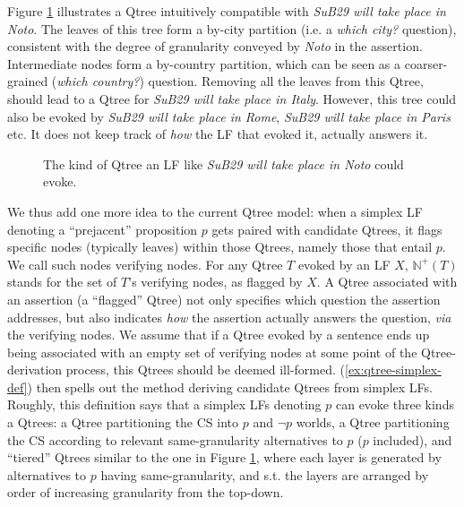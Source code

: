 Figure \ref{fig:qtree-intuition} illustrates a Qtree intuitively compatible with \textit{SuB29 will take place in Noto}. The leaves of this tree form a by-city partition (i.e. a \textit{which city?} question), consistent with the degree of granularity conveyed by \textit{Noto} in the assertion. Intermediate nodes form a by-country partition, which can be seen as a coarser-grained (\textit{which country?}) question. Removing all the leaves from this Qtree, should lead to a Qtree for \textit{SuB29 will take place in Italy}. However, this tree could also be evoked by \textit{SuB29 will take place in Rome}, \textit{SuB29 will take place in Paris} etc. It does not keep track of \textit{how} the LF that evoked it, actually answers it.

\begin{figure}[H]
	\centering
	\scalebox{.7}{
		\begin{forest}
			[CS[Italy[Noto][Rome][...]][France[Paris][Lyon][...]][UK[London][...]][...]]
	\end{forest}}
	\caption{The kind of Qtree an LF like \textit{SuB29 will take place in Noto} could evoke.}\label{fig:qtree-intuition}
\end{figure}

We thus add one more idea to the current Qtree model: when a simplex LF denoting a ``prejacent'' proposition $p$ gets paired with candidate Qtrees, it flags specific nodes (typically leaves) within those Qtrees, namely those that entail $p$. We call such nodes verifying nodes. For any Qtree $T$ evoked by an LF $X$, $\mathbb{N}^+(T)$ stands for the set of $T$'s verifying nodes, as flagged by $X$. A Qtree associated with an assertion (a ``flagged'' Qtree) not only specifies which question the assertion addresses, but also indicates \textit{how} the assertion actually answers the question, \textit{via} the verifying nodes. We assume that if a Qtree evoked by a sentence ends up being associated with an empty set of verifying nodes at some point of the Qtree-derivation process, this Qtrees should be deemed ill-formed. (\ref{ex:qtree-simplex-def}) then spells out the method deriving candidate Qtrees from simplex LFs. Roughly, this definition says that a simplex LFs denoting $p$ can evoke three kinds a Qtrees: a Qtree partitioning the CS into $p$ and $\neg p$ worlds, a Qtree partitioning the CS according to relevant same-granularity alternatives to $p$ ($p$ included), and ``tiered''  Qtrees similar to the one in Figure \ref{fig:qtree-intuition}, where each layer is generated by alternatives to $p$ having same-granularity, and s.t. the layers are arranged by order of increasing granularity from the top-down.

